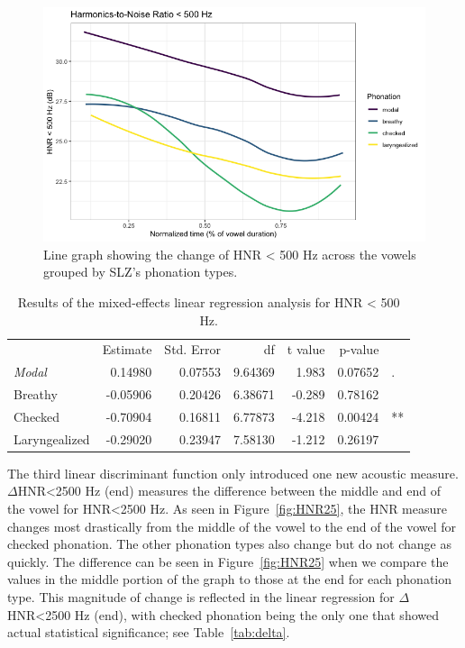 \documentclass[12pt, letterpaper]{article}
\providecommand{\lsptoprule}{\midrule\toprule}
\providecommand{\lspbottomrule}{\bottomrule\midrule}
\begin{document}
\begin{figure}[!h]
	\centering
	\includegraphics[width=.75\linewidth]{Images/HNR05.png}
	\caption{Line graph showing the change of HNR < 500 Hz across the vowels grouped by SLZ's phonation types.}
	\label{fig:HNR05}
\end{figure}

\begin{table}[!h]
    \centering
    \caption{Results of the mixed-effects linear regression analysis for HNR < 500 Hz.}
    \label{tab:HNR05}
    \begin{tabular}{lrrrrrl}
	\lsptoprule
					&  Estimate  & Std. Error & df & t value & p-value & \\
        \textit{Modal}  &  0.14980  & 0.07553 & 9.64369 &  1.983 & 0.07652 & . \\  
  	Breathy   		&  -0.05906 & 0.20426 & 6.38671 & -0.289 & 0.78162 &  \\
	Checked    		&  -0.70904 & 0.16811 & 6.77873 & -4.218 & 0.00424 & ** \\
	Laryngealized	&  -0.29020 & 0.23947 & 7.58130 & -1.212 & 0.26197 & \\
    \lspbottomrule
    \end{tabular}
\end{table}

The third linear discriminant function only introduced one new acoustic measure. $ \Delta $HNR<2500 Hz (end) measures the difference between the middle and end of the vowel for HNR\textless 2500 Hz. As seen in Figure~\ref{fig:HNR25}, the HNR measure changes most drastically from the middle of the vowel to the end of the vowel for checked phonation. The other phonation types also change but do not change as quickly. The difference can be seen in Figure~\ref{fig:HNR25} when we compare the values in the middle portion of the graph to those at the end for each phonation type. This magnitude of change is reflected in the linear regression for $ \Delta $ HNR<2500 Hz (end), with checked phonation being the only one that showed actual statistical significance; see Table~\ref{tab:delta}. 
\end{document}

